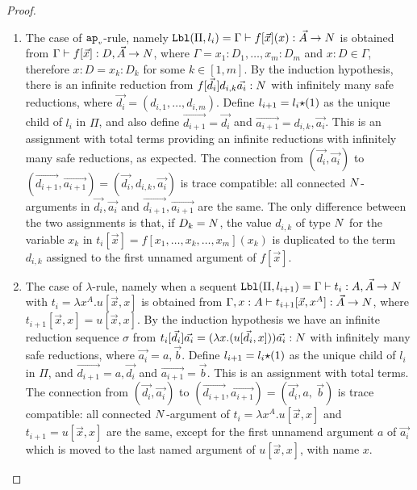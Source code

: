 \begin{proof}
\begin{enumerate}
\item
  The case of ${{\tt ap}_{\mbox{\tiny $v$}}}$-rule, namely 
  ${\tt Lbl}(\Pi,l_i) 
  = 
  \Gamma \vdash f[\vec{x}](x): \vec{A}\rightarrow{N}$ is obtained from
  $\Gamma \vdash f[\vec{x}]: D,\vec{A} \rightarrow {N}$,
  where $\Gamma=x_1:D_1,\ldots,x_m:D_m$ and $x:D\in\Gamma$, therefore
  $x:D = x_k:D_k$ for some $k \in [1,m]$. 
  By the induction hypothesis, there is an infinite reduction from $f[\vec{d_i}]d_{i,k}\vec{a_i}:{N}$
  with infinitely many safe reductions,
  where $\vec{d_i} = (d_{i,1},\ldots,d_{i,m})$. 
  Define $l_{i+1}=l_i{\star}(1)$ as the unique child of $l_i$ in $\Pi$, and
  also define $\vec{d_{i+1}} = \vec{d_i}$ and $\vec{a_{i+1}} = d_{i,k},\vec{a_i}$. 
  This is an assignment with total terms providing an infinite reductions with 
  infinitely many safe reductions, as expected.
  The connection from
  $(\vec{d_i},\vec{a_i})$ to
  $(\vec{d_{i+1}},\vec{a_{i+1}}) = (\vec{d_i},d_{i,k},\vec{a_i})$
  is trace compatible: all connected ${N}$-arguments in $\vec{d_i},\vec{a_i}$ and 
  $\vec{d_{i+1}},\vec{a_{i+1}}$ are the same.  
  The only difference between the two assignments
  is that, if $D_k = {N}$, the value $d_{i,k}$ of type ${N}$ for the variable $x_k$
  in $t_i[\vec{x}]=f[x_1,\ldots,x_k,\ldots,x_m](x_k)$ is duplicated to the term $d_{i,k}$ 
  assigned to the first unnamed argument of $ f[\vec{x}]$. 


\item
  The case of $\lambda$-rule, namely when a sequent
  ${\tt Lbl}(\Pi,l_{i+1}) = 
    \Gamma\vdash t_i : A, \vec{A} \rightarrow {N}$ with $t_i = \lambda x^A.u[\vec{x},x]$
  is obtained from
  $\Gamma,x:A\vdash t_{i+1}[\vec{x},x^A]:\vec{A}\rightarrow{N}$, 
  where $t_{i+1}[\vec{x},x]=u[\vec{x},x]$.
  By the induction hypothesis we have an infinite reduction sequence $\sigma$ from
  $t_i[\vec{d_i}]\vec{a_i} = (\lambda x.(u[\vec{d_i},x]))\vec{a_i}:{N}$ with infinitely many safe
  reductions,
  where $\vec{a_i} = a,\vec{b}$. 
  Define $l_{i+1}=l_i{\star}(1)$ as the unique child of $l_i$ in $\Pi$,
  and $\vec{d_{i+1}} = a,\vec{d_i}$  and $\vec{a_{i+1}} = \vec{b}$. 
  This is an assignment with total terms.
    The connection from 
  $(\vec{d_i},\vec{a_i})$ to $(\vec{d_{i+1}},\vec{a_{i+1}}) = (\vec{d_i},a, \ \vec{b})$ is
  trace compatible: all connected ${N}$-argument of 
  $t_{i}=\lambda x^A.u[\vec{x},x]$ and $t_{i+1}=u[\vec{x},x]$ are 
  the same, except for the first unnamend argument $a$ of $\vec{a_i}$ which is moved to
  the last named argument of $u[\vec{x},x]$, with name $x$.
  

\end{enumerate}
\end{proof}
